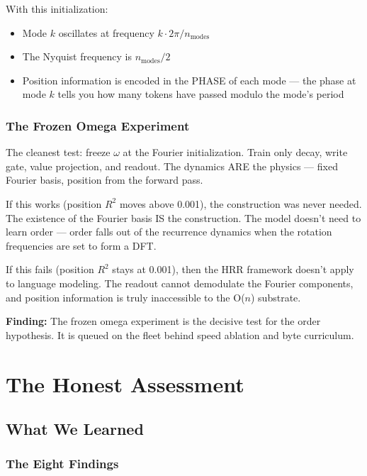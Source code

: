 \documentclass[11pt,a4paper]{report}
\newcommand{\finding}[1]{\textcolor{finding}{\textbf{Finding:}} #1}
\begin{document}
With this initialization:
\begin{itemize}[nosep]
\item Mode $k$ oscillates at frequency $k \cdot 2\pi / n_\text{modes}$
\item The Nyquist frequency is $n_\text{modes} / 2$
\item Position information is encoded in the PHASE of each mode --- the phase at mode $k$ tells you how many tokens have passed modulo the mode's period
\end{itemize}

\section{The Frozen Omega Experiment}

The cleanest test: freeze $\omega$ at the Fourier initialization. Train only decay, write gate, value projection, and readout. The dynamics ARE the physics --- fixed Fourier basis, position from the forward pass.

If this works (position $R^2$ moves above 0.001), the construction was never needed. The existence of the Fourier basis IS the construction. The model doesn't need to learn order --- order falls out of the recurrence dynamics when the rotation frequencies are set to form a DFT.

If this fails (position $R^2$ stays at 0.001), then the HRR framework doesn't apply to language modeling. The readout cannot demodulate the Fourier components, and position information is truly inaccessible to the O($n$) substrate.

\finding{The frozen omega experiment is the decisive test for the order hypothesis. It is queued on the fleet behind speed ablation and byte curriculum.}


\part{The Honest Assessment}
\label{part:honest}

\chapter{What We Learned}

\section{The Eight Findings}
\end{document}
